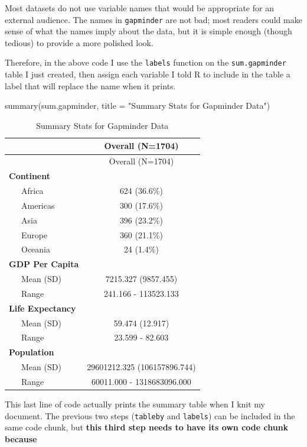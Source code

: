 \documentclass[
]{book}
\makeatletter
\newenvironment{Shaded}{\begin{snugshade}}{\end{snugshade}}
\newcommand{\AttributeTok}[1]{\textcolor[rgb]{0.61,0.61,0.61}{#1}}
\newcommand{\FunctionTok}[1]{\textcolor[rgb]{0,0,0}{#1}}
\newcommand{\NormalTok}[1]{#1}
\newcommand{\StringTok}[1]{\textcolor[rgb]{0.5,0.5,0.5}{#1}}
\newenvironment{kframe}{%
\medskip{}
\setlength{\fboxsep}{.8em}
 \def\at@end@of@kframe{}%
 \ifinner\ifhmode%
  \def\at@end@of@kframe{\end{minipage}}%
  \begin{minipage}{\columnwidth}%
 \fi\fi%
 \def\FrameCommand##1{\hskip\@totalleftmargin \hskip-\fboxsep
 \colorbox{shadecolor}{##1}\hskip-\fboxsep
     \hskip-\linewidth \hskip-\@totalleftmargin \hskip\columnwidth}%
 \MakeFramed {\advance\hsize-\width
   \@totalleftmargin\z@ \linewidth\hsize
   \@setminipage}}%
 {\par\unskip\endMakeFramed%
 \at@end@of@kframe}
\renewenvironment{Shaded}{\begin{kframe}}{\end{kframe}}
\makeatother
\begin{document}
Most datasets do not use variable names that would be appropriate for an external audience. The names in \texttt{gapminder} are not bad; most readers could make sense of what the names imply about the data, but it is simple enough (though tedious) to provide a more polished look.

Therefore, in the above code I use the \texttt{labels} function on the \texttt{sum.gapminder} table I just created, then assign each variable I told R to include in the table a label that will replace the name when it prints.

\begin{Shaded}
\begin{Highlighting}[]
\FunctionTok{summary}\NormalTok{(sum.gapminder, }\AttributeTok{title =} \StringTok{"Summary Stats for Gapminder Data"}\NormalTok{)}
\end{Highlighting}
\end{Shaded}

\begin{longtable}[]{@{}lc@{}}
\caption{Summary Stats for Gapminder Data}\tabularnewline
\toprule
& Overall (N=1704) \\
\midrule
\endfirsthead
\toprule
& Overall (N=1704) \\
\midrule
\endhead
\textbf{Continent} & \\
~~~Africa & 624 (36.6\%) \\
~~~Americas & 300 (17.6\%) \\
~~~Asia & 396 (23.2\%) \\
~~~Europe & 360 (21.1\%) \\
~~~Oceania & 24 (1.4\%) \\
\textbf{GDP Per Capita} & \\
~~~Mean (SD) & 7215.327 (9857.455) \\
~~~Range & 241.166 - 113523.133 \\
\textbf{Life Expectancy} & \\
~~~Mean (SD) & 59.474 (12.917) \\
~~~Range & 23.599 - 82.603 \\
\textbf{Population} & \\
~~~Mean (SD) & 29601212.325 (106157896.744) \\
~~~Range & 60011.000 - 1318683096.000 \\
\bottomrule
\end{longtable}

This last line of code actually prints the summary table when I knit my document. The previous two steps (\texttt{tableby} and \texttt{labels}) can be included in the same code chunk, but \textbf{this third step needs to have its own code chunk because}
\end{document}
